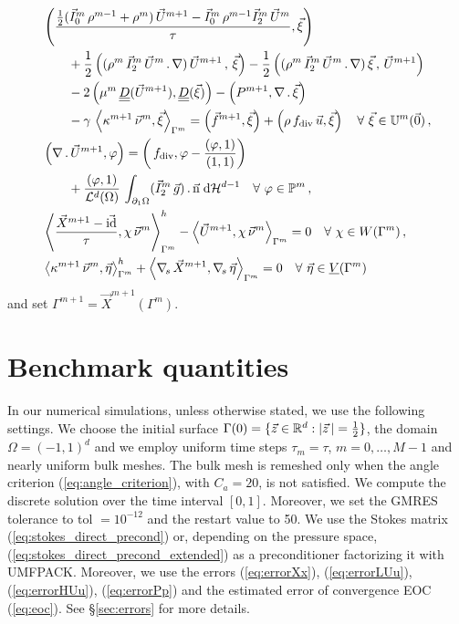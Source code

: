 \begin{subequations}
\begin{align}
& \left(\frac{\tfrac{1}{2}(\vec I^m_0\,\rho^{m-1}+\rho^m)\,\vec U^{m+1} -
\vec I^m_0\,\rho^{m-1} \vec I^m_2\,\vec U^m}{\tau}, \vec \xi \right)\nonumber \\
& \qquad + \frac{1}{2}\left((\rho^m\,\vec I^m_2\,\vec U^m\,.\,\nabla)\,
\vec U^{m+1}\,,\,\vec \xi \right) - \frac{1}{2} \left((\rho^m\,
\vec I^m_2 \, \vec U^m\,.\,\nabla)\,\vec \xi\,,\,\vec U^{m+1} \right)
\nonumber \\
& \qquad - 2\left(\mu^m\,\mat D(\vec U^{m+1}), \mat D(\vec \xi) \right)
- \left(P^{m+1}, \nabla\,.\,\vec \xi\right) \nonumber \\
& \qquad - \gamma\,\left\langle
\kappa^{m+1}\,\vec\nu^m,\vec\xi\right\rangle_{\Gamma^m}
= \left(\vec f^{m+1}, \vec \xi\right)
+\left(\rho\,f_{\rm{div}}\,\vec u,\vec\xi\right) \quad \forall\ \vec\xi \in
\uspacedisc{0}{m}\,,\\
& \left(\nabla\,.\,\vec U^{m+1}, \varphi\right)  = \left(\,f_{\rm{div}},
\varphi-\frac{\left(\varphi,1\right)}{\left(1,1\right)}\right) \nonumber \\
& \qquad +\frac{\left(\varphi, 1\right)}{\vol(\Omega)}\, \int_{\partial_1\Omega}
(\vec I^m_2\,\vec g) \,.\, \unitn \dH{d-1}
\quad \forall\ \varphi \in \pspace^m\,, \\
&  \left\langle \frac{\vec X^{m+1} - \vec\id}{\tau} ,\chi\,\vec\nu^m
\right\rangle_{\Gamma^m}^h - \left\langle \vec U^{m+1}, \chi\,\vec\nu^m
\right\rangle_{\Gamma^m}  = 0 \quad \forall\ \chi \in \Wh\,,\\
& \left\langle \kappa^{m+1}\,\vec\nu^m, \vec\eta \right\rangle_{\Gamma^m}^h
+ \left\langle \nabs\,\vec X^{m+1}, \nabs\,\vec \eta \right\rangle_{\Gamma^m} =
0 \quad \forall\ \vec\eta \in \Vh
\end{align}
\end{subequations}
and set $\Gamma^{m+1} = \vec X^{m+1}(\Gamma^m)$.

\section{Benchmark quantities}\label{sec:benchmark_quantities}
In our numerical simulations, unless otherwise stated, we use the following
settings. We choose the initial surface $\Gamma(0) = \{ \vec z \in \mathbb R^d : |\vec
z\,| = \frac12 \}$, the domain $\Omega = (-1,1)^d$ and we employ uniform time
steps $\tau_m=\tau$, $m=0,\ldots, M-1$ and nearly uniform bulk meshes. The bulk
mesh is remeshed only when the angle criterion (\ref{eq:angle_criterion}), with
$C_a=20$\textdegree, is not satisfied. We compute the discrete solution over
the time interval $[0,1]$. Moreover, we set the GMRES tolerance to
tol $=10^{-12}$ and the restart value to 50. We use the Stokes matrix
(\ref{eq:stokes_direct_precond}) or, depending on the pressure space,
(\ref{eq:stokes_direct_precond_extended}) as a preconditioner factorizing it
with UMFPACK. Moreover, we use the errors (\ref{eq:errorXx}),
(\ref{eq:errorLUu}), (\ref{eq:errorHUu}), (\ref{eq:errorPp}) and the estimated
error of convergence EOC (\ref{eq:eoc}). See \S\ref{sec:errors} for more
details.


